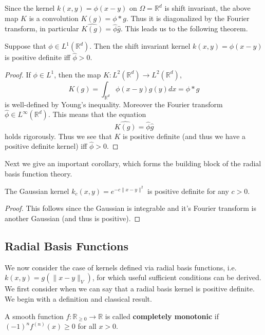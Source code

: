 Since the kernel $k(x,y) = \phi(x-y)$ on $\Omega = \mathbb{R}^d$ is shift invariant, the above map $K$ is a convolution $K(g) = \phi*g$. Thus it is diagonalized by the Fourier transform, in particular $\widehat{K(g)} = \hat{\phi}\hat{g}$. This leads us to the following theorem.
\begin{theorem}
 Suppose that $\phi\in L^1(\mathbb{R}^d)$. Then the shift invariant kernel $k(x,y) = \phi(x-y)$ is positive definite iff $\hat{\phi} > 0$.
\end{theorem}
\begin{proof}
 If $\phi\in L^1$, then the map $K:L^2(\mathbb{R}^d)\rightarrow L^2(\mathbb{R}^d)$,
 \begin{equation}
  K(g) = \int_{\mathbb{R}^d} \phi(x-y)g(y)dx = \phi*g
 \end{equation}
 is well-defined by Young's inequality. Moreover the Fourier transform $\hat{\phi}\in L^\infty(\mathbb{R}^d)$. This means that the equation
 \begin{equation}
  \widehat{K(g)} = \hat{\phi}\hat{g}
 \end{equation}
 holds rigorously. Thus we see that $K$ is positive definite (and thus we have a positive definite kernel) iff $\hat{\phi} > 0$.
\end{proof}
Next we give an important corollary, which forms the building block of the radial basis function theory.
\begin{corollary}\label{gaussian-corollary}
 The Gaussian kernel $k_c(x,y) = e^{-c\|x-y\|^2}$ is positive definite for any $c > 0$.
\end{corollary}
\begin{proof}
 This follows since the Gaussian is integrable and it's Fourier transform is another Gaussian (and thus is positive).
\end{proof}


\subsection{Radial Basis Functions}
We now consider the case of kernels defined via radial basis functions, i.e. $k(x,y) = g(\|x-y\|_V)$, for which useful sufficient conditions can be derived. We first consider when we can say that a radial basis kernel is positive definite.
We begin with a definition and classical result.

\begin{definition}
 A smooth function $f:\mathbb{R}_{\geq 0}\rightarrow \mathbb{R}$ is called \textbf{completely monotonic} if $(-1)^nf^{(n)}(x) \geq 0$ for all $x > 0$.
\end{definition}


